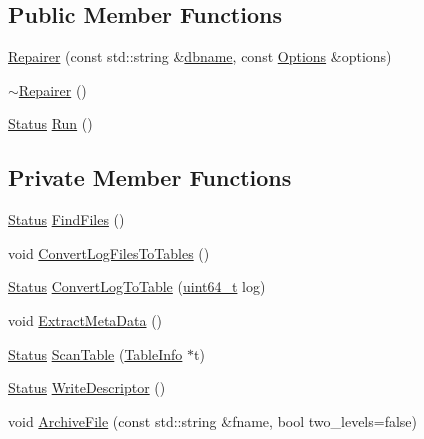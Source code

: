 \subsection*{Public Member Functions}
\begin{DoxyCompactItemize}
\item 
\hyperlink{classleveldb_1_1anonymous__namespace_02repair_8cc_03_1_1_repairer_a40e11b36cb2e900f1d14b0e5b661c23f}{Repairer} (const std\+::string \&\hyperlink{c__test_8c_a75d845559336df6843f3b599960f89d2}{dbname}, const \hyperlink{structleveldb_1_1_options}{Options} \&options)
\item 
\hyperlink{classleveldb_1_1anonymous__namespace_02repair_8cc_03_1_1_repairer_a67700fe3d6942f972abc729cb6be70c0}{$\sim$\+Repairer} ()
\item 
\hyperlink{classleveldb_1_1_status}{Status} \hyperlink{classleveldb_1_1anonymous__namespace_02repair_8cc_03_1_1_repairer_abba6586bedbead266d5530109b51ff05}{Run} ()
\end{DoxyCompactItemize}
\subsection*{Private Member Functions}
\begin{DoxyCompactItemize}
\item 
\hyperlink{classleveldb_1_1_status}{Status} \hyperlink{classleveldb_1_1anonymous__namespace_02repair_8cc_03_1_1_repairer_a71ebd329d59366e73e3e065856f0a24c}{Find\+Files} ()
\item 
void \hyperlink{classleveldb_1_1anonymous__namespace_02repair_8cc_03_1_1_repairer_a8c1a4d175bef4d9363707810136b9ef9}{Convert\+Log\+Files\+To\+Tables} ()
\item 
\hyperlink{classleveldb_1_1_status}{Status} \hyperlink{classleveldb_1_1anonymous__namespace_02repair_8cc_03_1_1_repairer_ab4fcce4f73f7d4a344ee78d1f000da68}{Convert\+Log\+To\+Table} (\hyperlink{stdint_8h_aaa5d1cd013383c889537491c3cfd9aad}{uint64\+\_\+t} log)
\item 
void \hyperlink{classleveldb_1_1anonymous__namespace_02repair_8cc_03_1_1_repairer_a4baca5b4b14a672876c8c365be71ea1e}{Extract\+Meta\+Data} ()
\item 
\hyperlink{classleveldb_1_1_status}{Status} \hyperlink{classleveldb_1_1anonymous__namespace_02repair_8cc_03_1_1_repairer_ad6beafa57467a8f4b240b99a5ca9650e}{Scan\+Table} (\hyperlink{structleveldb_1_1anonymous__namespace_02repair_8cc_03_1_1_repairer_1_1_table_info}{Table\+Info} $\ast$t)
\item 
\hyperlink{classleveldb_1_1_status}{Status} \hyperlink{classleveldb_1_1anonymous__namespace_02repair_8cc_03_1_1_repairer_a5555c41fd84042f25effb2d29ad137d6}{Write\+Descriptor} ()
\item 
void \hyperlink{classleveldb_1_1anonymous__namespace_02repair_8cc_03_1_1_repairer_a51b1eb997396ce7115340b907cd47d40}{Archive\+File} (const std\+::string \&fname, bool two\+\_\+levels=false)
\end{DoxyCompactItemize}
